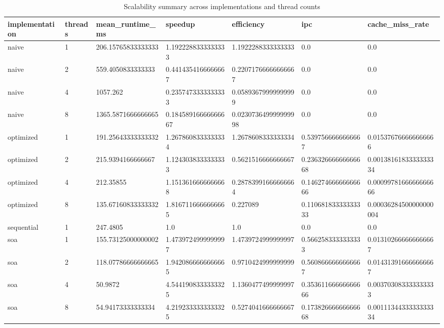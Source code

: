 \begin{table}[ht]
\centering
\small
\begin{tabular}{lllllll}
\hline
implementation & threads & mean_runtime_ms & speedup & efficiency & ipc & cache_miss_rate \\ 
\hline
naive & 1 & 206.15765833333333 & 1.1922288333333333 & 1.1922288333333333 & 0.0 & 0.0 \\ 
naive & 2 & 559.4050833333333 & 0.4414354166666667 & 0.22071766666666667 & 0.0 & 0.0 \\ 
naive & 4 & 1057.262 & 0.2357473333333333 & 0.05893679999999999 & 0.0 & 0.0 \\ 
naive & 8 & 1365.5871666666665 & 0.18458916666666667 & 0.023073649999999998 & 0.0 & 0.0 \\ 
optimized & 1 & 191.25643333333332 & 1.2678608333333334 & 1.2678608333333334 & 0.5397566666666667 & 0.015376766666666666 \\ 
optimized & 2 & 215.9394166666667 & 1.1243038333333333 & 0.5621516666666667 & 0.23632666666666668 & 0.0013816183333333334 \\ 
optimized & 4 & 212.35855 & 1.1513616666666668 & 0.28783991666666664 & 0.14627466666666666 & 0.0009978166666666666 \\ 
optimized & 8 & 135.67160833333332 & 1.8167116666666665 & 0.227089 & 0.11068183333333333 & 0.00036284500000000004 \\ 
sequential & 1 & 247.4805 & 1.0 & 1.0 & 0.0 & 0.0 \\ 
soa & 1 & 155.73125000000002 & 1.4739724999999997 & 1.4739724999999997 & 0.5662583333333333 & 0.013102666666666667 \\ 
soa & 2 & 118.07786666666665 & 1.9420866666666665 & 0.9710424999999999 & 0.5608666666666667 & 0.014313916666666667 \\ 
soa & 4 & 50.9872 & 4.5441908333333325 & 1.1360477499999997 & 0.35361166666666666 & 0.003703083333333333 \\ 
soa & 8 & 54.94173333333334 & 4.2192333333333325 & 0.5274041666666667 & 0.17382666666666668 & 0.0011134433333333334 \\ 
\hline
\end{tabular}
\caption{Scalability summary across implementations and thread counts}
\label{tab:scalability_summary}
\end{table}
